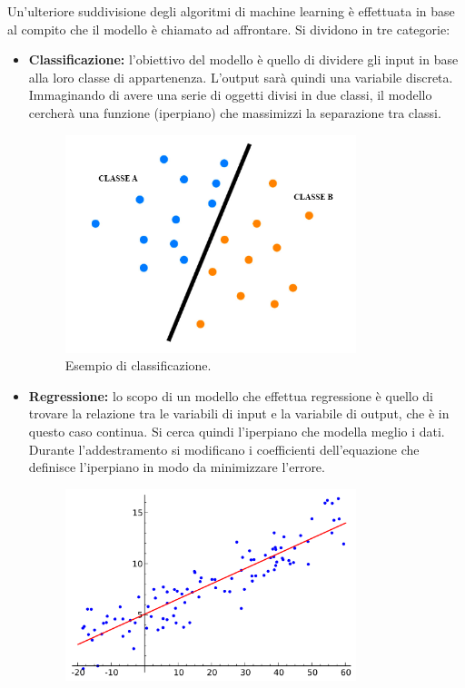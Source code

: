 \documentclass[12pt,a4paper,twoside,openright]{book}
\begin{document}
Un'ulteriore suddivisione degli algoritmi di machine learning è effettuata in base al compito che il modello è chiamato ad affrontare. Si dividono in tre categorie:
\begin{itemize}
    \item \textbf{Classificazione:} l'obiettivo del modello è quello di dividere gli input in base alla loro classe di appartenenza. L'output sarà quindi una variabile discreta. Immaginando di avere una serie di oggetti divisi in due classi, il modello cercherà una funzione (iperpiano) che massimizzi la separazione tra classi.
        \begin{figure}[H]
        \centering
        \includegraphics[width=0.8\textwidth]{images/class.png}
        \caption{Esempio di classificazione.}
        \label{fig:rapp_file}
        \end{figure}
    \item \textbf{Regressione:} lo scopo di un modello che effettua regressione è quello di trovare la relazione tra le variabili di input e la variabile di output, che è in questo caso continua. Si cerca quindi l'iperpiano che modella meglio i dati. Durante l'addestramento si modificano i coefficienti dell'equazione che definisce l'iperpiano in modo da minimizzare l'errore.
        \begin{figure}[H]
        \centering
        \includegraphics[width=0.8\textwidth]{images/regressione.png}

\end{figure}
\end{itemize}
\end{document}

